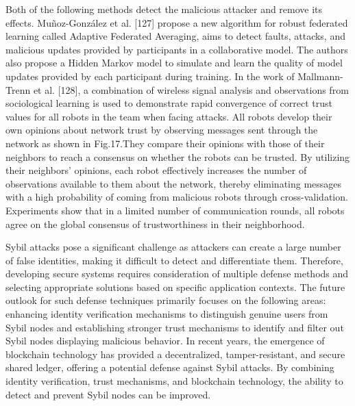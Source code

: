 Both of the following methods detect the malicious
attacker and remove its effects. Muñoz-González et al.
[127] propose a new algorithm for robust federated learning
called Adaptive Federated Averaging, aims to detect
faults, attacks, and malicious updates provided by
participants in a collaborative model. The authors also propose
a Hidden Markov model to simulate and learn the quality
of model updates provided by each participant during
training. In the work of Mallmann-Trenn et al. [128], a
combination of wireless signal analysis and observations
from sociological learning is used to demonstrate rapid
convergence of correct trust values for all robots in the
team when facing attacks. All robots develop their own
opinions about network trust by observing messages sent
through the network as shown in Fig.17.They compare
their opinions with those of their neighbors to reach
a consensus on whether the robots can be trusted. By
utilizing their neighbors’ opinions, each robot effectively
increases the number of observations available to them
about the network, thereby eliminating messages with a
high probability of coming from malicious robots through
cross-validation. Experiments show that in a limited
number of communication rounds, all robots agree on the
global consensus of trustworthiness in their neighborhood. 

Sybil attacks pose a significant challenge as attackers
can create a large number of false identities, making it
diﬀicult to detect and differentiate them. Therefore,
developing secure systems requires consideration of multiple
defense methods and selecting appropriate solutions based
on specific application contexts. The future outlook for
such defense techniques primarily focuses on the following
areas: enhancing identity verification mechanisms to
distinguish genuine users from Sybil nodes and establishing
stronger trust mechanisms to identify and filter out Sybil
nodes displaying malicious behavior. In recent years,
the emergence of blockchain technology has provided a
decentralized, tamper-resistant, and secure shared ledger,
offering a potential defense against Sybil attacks. By
combining identity verification, trust mechanisms, and
blockchain technology, the ability to detect and prevent
Sybil nodes can be improved.  

